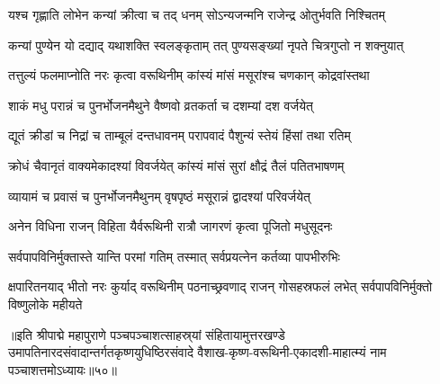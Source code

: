 \twolineshloka
{यश्च गृह्णाति लोभेन कन्यां क्रीत्वा च तद् धनम्}
{सोऽन्यजन्मनि राजेन्द्र ओतुर्भवति निश्चितम्}%

\twolineshloka
{कन्यां पुण्येन यो दद्याद् यथाशक्ति स्वलङ्कृताम्}
{तत् पुण्यसङ्ख्यां नृपते चित्रगुप्तो न शक्नुयात्}%

\twolineshloka
{तत्तुल्यं फलमाप्नोति नरः कृत्वा वरूथिनीम्}
{कांस्यं मांसं मसूरांश्च चणकान् कोद्रवांस्तथा}%

\twolineshloka
{शाकं मधु परान्नं च पुनर्भोजनमैथुने}
{वैष्णवो व्रतकर्ता च दशम्यां दश वर्जयेत्}%

\twolineshloka
{द्यूतं क्रीडां च निद्रां च ताम्बूलं दन्तधावनम्}
{परापवादं पैशुन्यं स्तेयं हिंसां तथा रतिम्}%

\twolineshloka
{क्रोधं चैवानृतं वाक्यमेकादश्यां विवर्जयेत्}
{कांस्यं मांसं सुरां क्षौद्रं  तैलं पतितभाषणम्}%

\twolineshloka
{व्यायामं च प्रवासं च पुनर्भोजनमैथुनम्}
{वृषपृष्ठं मसूरान्नं द्वादश्यां परिवर्जयेत्}%

\twolineshloka
{अनेन विधिना राजन् विहिता यैर्वरूथिनी}
{रात्रौ जागरणं कृत्वा पूजितो मधुसूदनः}%

\twolineshloka
{सर्वपापविनिर्मुक्तास्ते यान्ति परमां गतिम्}
{तस्मात् सर्वप्रयत्नेन कर्तव्या पापभीरुभिः}%

\threelineshloka
{क्षपारितनयाद् भीतो नरः कुर्याद् वरूथिनीम्}
{पठनाच्छ्रवणाद् राजन् गोसहस्रफलं लभेत्}
{सर्वपापविनिर्मुक्तो विष्णुलोके महीयते}%

॥इति श्रीपाद्मे महापुराणे पञ्चपञ्चाशत्साहस्र्यां संहितायामुत्तरखण्डे उमापतिनारदसंवादान्तर्गतकृष्णयुधिष्ठिरसंवादे वैशाख-कृष्ण-वरूथिनी-एकादशी-माहात्म्यं नाम पञ्चाशत्तमोऽध्यायः॥५०॥

\genMangalaShloka

\hyperref[sec:ekadashi_mahatmyam_padma_puranam]{\closesub}
\clearpage

